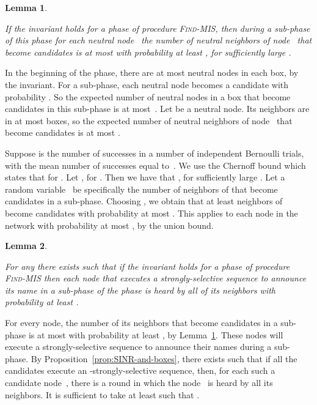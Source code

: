 \documentclass[11pt]{article}
\newcommand{\qed}{\hfill  \smallskip}
\newenvironment{proof}{\noindent{\bf Proof:}}{\qed}
\newtheorem{lemma}{Lemma}
\begin{document}
\begin{lemma}
\label{lem:candidates}

If the invariant holds for a phase of procedure \textsc{Find-MIS}, then during a sub-phase of this phase for each neutral node~ the number of neutral neighbors of node~ that become candidates is at most  with probability at least ,  for sufficiently large . 
\end{lemma}


\begin{proof}
In the beginning of the phase, there are at most  neutral nodes in each box, by the invariant.
For a sub-phase, each neutral node becomes a candidate with probability .
So the expected number of neutral nodes in a box that become candidates in this sub-phase is at most~.
Let  be a neutral node.
Its neighbors are in at most  boxes, so the expected number of neutral neighbors of node~ that become candidates is at most .

Suppose  is the number of successes in a number of independent Bernoulli trials, with  the mean number of successes equal to~.
We use the Chernoff bound which states that   for  .
Let , for .
Then we have that , for sufficiently large .
Let a random variable~ be specifically the number of neighbors of  that become candidates in a sub-phase.
Choosing , we obtain that at least  neighbors of  become candidates with probability at most .
This applies to each node in the network with probability at most , by the union bound.
\end{proof}




\begin{lemma}
\label{lem:hearing}

For any  there exists  such that if the invariant  holds for a phase of procedure \textsc{Find-MIS} then each  node that executes a strongly-selective sequence to announce its name in a sub-phase of the phase is heard by all of its neighbors with probability at least . 
\end{lemma}

\begin{proof}
For every node, the number of its neighbors that become candidates in a sub-phase is at most  with probability at least , by Lemma~\ref{lem:candidates}.
These nodes will execute a strongly-selective sequence to announce their names during a sub-phase.
By Proposition~\ref{prop:SINR-and-boxes}, there exists  such that if all the candidates execute an -strongly-selective sequence, then, for each such a candidate node~, there is a round in which the node~  is heard by all its neighbors.
It is sufficient to take  at least such that .
\end{proof}
\end{document}
